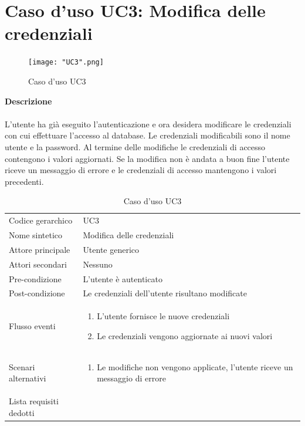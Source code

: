 \documentclass[a4paper]{report}
\begin{document}
	\section{Caso d'uso UC3: Modifica delle credenziali}
	 	\begin{figure}[H]
			\centering
			\texttt{[image: "UC3".png]}
			\caption{Caso d'uso UC3}
		\end{figure}
	 \textbf{Descrizione} \\ \\
	 L'utente ha già eseguito l'autenticazione e ora desidera modificare le credenziali con cui effettuare 
	 l'accesso al database. Le credenziali modificabili sono il nome utente e la password. Al termine delle
	 modifiche le credenziali di accesso contengono i valori aggiornati. Se la modifica non è andata a buon
	 fine l'utente riceve un messaggio di errore e le credenziali di accesso mantengono i valori precedenti.
		\begin{table}[H]
		\begin{tabularx}{\textwidth}{X | X}\toprule
			\rowcolor{orange!65}Codice gerarchico & UC3 \\
			Nome sintetico & Modifica delle credenziali \\
			\rowcolor{orange!65}Attore principale & Utente generico\\
			Attori secondari & Nessuno \\
			\rowcolor{orange!65}Pre-condizione & L'utente è autenticato \\
			Post-condizione & Le credenziali dell'utente risultano modificate \\
			\rowcolor{orange!65}Flusso eventi & \begin{enumerate}
			\item L'utente fornisce le nuove credenziali
			\item Le credenziali vengono aggiornate ai nuovi valori
			\end{enumerate} \\
			Scenari alternativi & \begin{enumerate}
			\item Le modifiche non vengono applicate, l'utente riceve un messaggio di errore
			\end{enumerate} \\
			\rowcolor{orange!65}Lista requisiti dedotti & \\
			\bottomrule
		\end{tabularx}
		\caption{Caso d'uso UC3}
	 \end{table}
\end{document}
